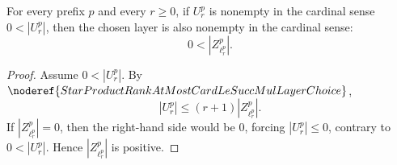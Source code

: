 \begin{lemma}
For every prefix \(p\) and every \(r\ge0\), if \(U_r^p\) is nonempty in
the cardinal sense \(0<|U_r^p|\), then the chosen layer is also nonempty in
the cardinal sense:
\[
  0<|Z_{\ell_r^p}^p|.
\]
\end{lemma}
\begin{proof}
Assume \(0<|U_r^p|\).  By
\(\noderef{StarProductRankAtMostCardLeSuccMulLayerChoice}\),
\[
  |U_r^p|\le (r+1)|Z_{\ell_r^p}^p|.
\]
If \(|Z_{\ell_r^p}^p|=0\), then the right-hand side would be \(0\), forcing
\(|U_r^p|\le0\), contrary to \(0<|U_r^p|\).  Hence
\(|Z_{\ell_r^p}^p|\) is positive.
\end{proof}
